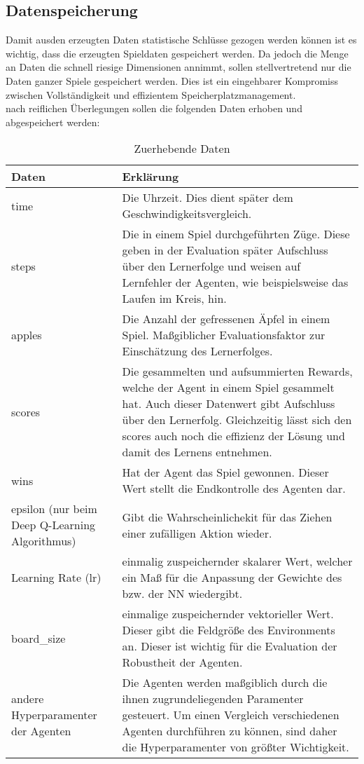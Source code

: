 \subsection{Datenspeicherung}
Damit ausden erzeugten Daten statistische Schlüsse gezogen werden können ist es wichtig, dass die erzeugten Spieldaten gespeichert werden. Da jedoch die Menge an Daten die schnell riesige Dimensionen annimmt, sollen stellvertretend nur die Daten ganzer Spiele gespeichert werden. Dies ist ein eingehbarer Kompromiss zwischen Vollständigkeit und effizientem Speicherplatzmanagement.\\
nach reiflichen Überlegungen sollen die folgenden Daten erhoben und abgespeichert werden:
\begin{longtable}[h]{|p{4cm}|p{\linewidth - 5cm}|}
	\caption{Zuerhebende Daten}
	\label{tab:Datenerhebung} 
	\endfirsthead
	\endhead
	\hline
	Daten & Erklärung \\
	\hline
	time & Die Uhrzeit. Dies dient später dem Geschwindigkeitsvergleich. \\
	\hline
	steps & Die in einem Spiel durchgeführten Züge. Diese geben in der Evaluation später Aufschluss über den Lernerfolge und weisen auf Lernfehler der Agenten, wie beispielsweise das Laufen im Kreis, hin. \\
	\hline
	apples & Die Anzahl der gefressenen Äpfel in einem Spiel. Maßgiblicher Evaluationsfaktor zur Einschätzung des Lernerfolges. \\
	\hline
	scores & Die gesammelten und aufsummierten Rewards, welche der Agent in einem Spiel gesammelt hat. Auch dieser Datenwert gibt Aufschluss über den Lernerfolg. Gleichzeitig lässt sich den scores auch noch die effizienz der Lösung und damit des Lernens entnehmen. \\
	\hline
	wins & Hat der Agent das Spiel gewonnen. Dieser Wert stellt die Endkontrolle des Agenten dar. \\
	\hline
	epsilon (nur beim Deep Q-Learning Algorithmus) & Gibt die Wahrscheinlichekit für das Ziehen einer zufälligen Aktion wieder.  \\
	\hline
	Learning Rate (lr) & einmalig zuspeichernder skalarer Wert, welcher ein Maß für die Anpassung der Gewichte des bzw. der NN wiedergibt. \\
	\hline
	board\_size &  einmalige zuspeichernder vektorieller Wert. Dieser gibt die Feldgröße des Environments an. Dieser ist wichtig für die Evaluation der Robustheit der Agenten. \\
	\hline
	andere Hyperparamenter der Agenten & Die Agenten werden maßgiblich durch die ihnen zugrundeliegenden Paramenter gesteuert. Um einen Vergleich verschiedenen Agenten durchführen zu können, sind daher die Hyperparamenter von größter Wichtigkeit. \\
	\hline
\end{longtable}

